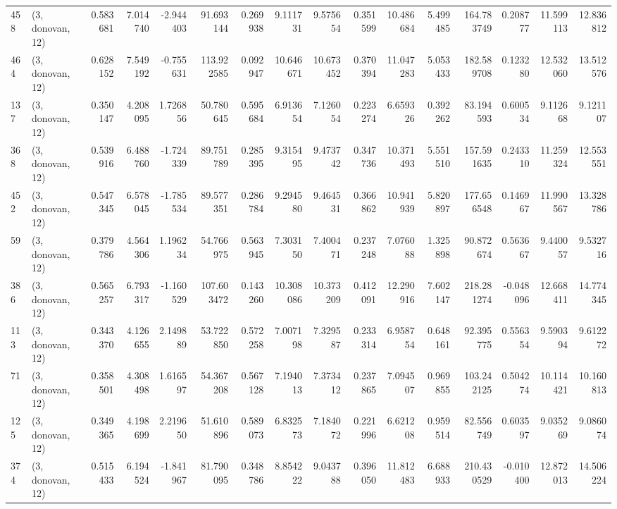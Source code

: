 \begin{tabular}{llrrrrrrrrrrrrrr}
458 &  (3, donovan, 12) &   0.583681 &   7.014740 &  -2.944403 &    91.693144 &   0.269938 &   9.111731 &   9.575654 &  0.351599 &  10.486684 &   5.499485 &   164.783749 &  0.208777 &  11.599113 &  12.836812 \\
464 &  (3, donovan, 12) &   0.628152 &   7.549192 &  -0.755631 &   113.922585 &   0.092947 &  10.646671 &  10.673452 &  0.370394 &  11.047283 &   5.053433 &   182.589708 &  0.123280 &  12.532060 &  13.512576 \\
137 &  (3, donovan, 12) &   0.350147 &   4.208095 &   1.726856 &    50.780645 &   0.595684 &   6.913654 &   7.126054 &  0.223274 &   6.659326 &   0.392262 &    83.194593 &  0.600534 &   9.112668 &   9.121107 \\
368 &  (3, donovan, 12) &   0.539916 &   6.488760 &  -1.724339 &    89.751789 &   0.285395 &   9.315495 &   9.473742 &  0.347736 &  10.371493 &   5.551510 &   157.591635 &  0.243310 &  11.259324 &  12.553551 \\
452 &  (3, donovan, 12) &   0.547345 &   6.578045 &  -1.785534 &    89.577351 &   0.286784 &   9.294580 &   9.464531 &  0.366862 &  10.941939 &   5.820897 &   177.656548 &  0.146967 &  11.990567 &  13.328786 \\
59  &  (3, donovan, 12) &   0.379786 &   4.564306 &   1.196234 &    54.766975 &   0.563945 &   7.303150 &   7.400471 &  0.237248 &   7.076088 &   1.325898 &    90.872674 &  0.563667 &   9.440057 &   9.532716 \\
386 &  (3, donovan, 12) &   0.565257 &   6.793317 &  -1.160529 &   107.603472 &   0.143260 &  10.308086 &  10.373209 &  0.412091 &  12.290916 &   7.602147 &   218.281274 & -0.048096 &  12.668411 &  14.774345 \\
113 &  (3, donovan, 12) &   0.343370 &   4.126655 &   2.149889 &    53.722850 &   0.572258 &   7.007198 &   7.329587 &  0.233314 &   6.958754 &   0.648161 &    92.395775 &  0.556354 &   9.590394 &   9.612272 \\
71  &  (3, donovan, 12) &   0.358501 &   4.308498 &   1.616597 &    54.367208 &   0.567128 &   7.194013 &   7.373412 &  0.237865 &   7.094507 &   0.969855 &   103.242125 &  0.504274 &  10.114421 &  10.160813 \\
125 &  (3, donovan, 12) &   0.349365 &   4.198699 &   2.219650 &    51.610896 &   0.589073 &   6.832573 &   7.184072 &  0.221996 &   6.621208 &   0.959514 &    82.556749 &  0.603597 &   9.035269 &   9.086074 \\
374 &  (3, donovan, 12) &   0.515433 &   6.194524 &  -1.841967 &    81.790095 &   0.348786 &   8.854222 &   9.043788 &  0.396050 &  11.812483 &   6.688933 &   210.430529 & -0.010400 &  12.872013 &  14.506224 \\

\end{tabular}
